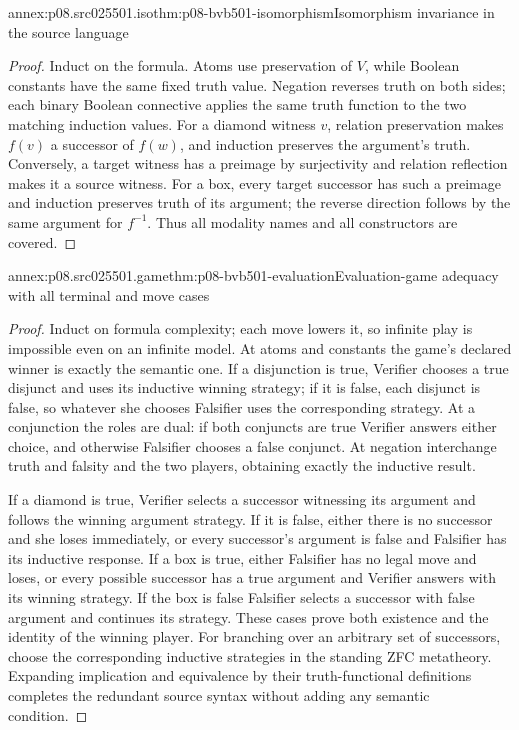 \begin{annexitem}{annex:p08.src025501.iso}{thm:p08-bvb501-isomorphism}{Isomorphism invariance in the source language}
\begin{proof}
Induct on the formula. Atoms use preservation of \(V\), while Boolean
constants have the same fixed truth value. Negation reverses truth on both
sides; each binary Boolean connective applies the same truth function to
the two matching induction values. For a diamond witness \(v\), relation
preservation makes \(f(v)\) a successor of \(f(w)\), and induction
preserves the argument's truth. Conversely, a target witness has a preimage
by surjectivity and relation reflection makes it a source witness.
For a box, every target successor has such a preimage and induction preserves
truth of its argument; the reverse direction follows by the same argument
for \(f^{-1}\). Thus all modality names and all constructors are covered.
\end{proof}
\end{annexitem}

\begin{annexitem}{annex:p08.src025501.game}{thm:p08-bvb501-evaluation}{Evaluation-game adequacy with all terminal and move cases}
\begin{proof}
Induct on formula complexity; each move lowers it, so infinite play is
impossible even on an infinite model. At atoms and constants the game's
declared winner is exactly the semantic one. If a disjunction is true,
Verifier chooses a true disjunct and uses its inductive winning strategy;
if it is false, each disjunct is false, so whatever she chooses Falsifier
uses the corresponding strategy. At a conjunction the roles are dual:
if both conjuncts are true Verifier answers either choice, and otherwise
Falsifier chooses a false conjunct. At negation interchange truth and
falsity and the two players, obtaining exactly the inductive result.

If a diamond is true, Verifier selects a successor witnessing its argument
and follows the winning argument strategy. If it is false, either there
is no successor and she loses immediately, or every successor's argument
is false and Falsifier has its inductive response. If a box is true,
either Falsifier has no legal move and loses, or every possible successor
has a true argument and Verifier answers with its winning strategy.
If the box is false Falsifier selects a successor with false argument and
continues its strategy. These cases prove both existence and the identity
of the winning player. For branching over an arbitrary set of successors,
choose the corresponding inductive strategies in the standing ZFC metatheory.
Expanding implication and equivalence by their truth-functional definitions
completes the redundant source syntax without adding any semantic condition.
\end{proof}
\end{annexitem}

